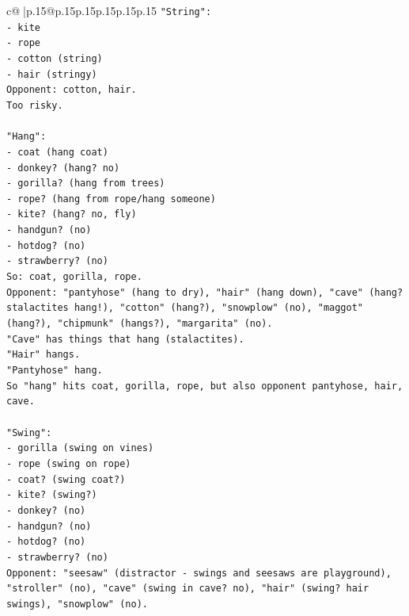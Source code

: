 \documentclass{article}
\begin{document}
{\begin{supertabular}{c@{$\;$}|p{.15\linewidth}@{}p{.15\linewidth}p{.15\linewidth}p{.15\linewidth}p{.15\linewidth}p{.15\linewidth}}
{{{\texttt{"String":} \\
\texttt{{-} kite} \\
\texttt{{-} rope} \\
\texttt{{-} cotton (string)} \\
\texttt{{-} hair (stringy)} \\
\texttt{Opponent: cotton, hair.} \\
\texttt{Too risky.} \\
\\ 
\texttt{"Hang":} \\
\texttt{{-} coat (hang coat)} \\
\texttt{{-} donkey? (hang? no)} \\
\texttt{{-} gorilla? (hang from trees)} \\
\texttt{{-} rope? (hang from rope/hang someone)} \\
\texttt{{-} kite? (hang? no, fly)} \\
\texttt{{-} handgun? (no)} \\
\texttt{{-} hotdog? (no)} \\
\texttt{{-} strawberry? (no)} \\
\texttt{So: coat, gorilla, rope.} \\
\texttt{Opponent: "pantyhose" (hang to dry), "hair" (hang down), "cave" (hang? stalactites hang!), "cotton" (hang?), "snowplow" (no), "maggot" (hang?), "chipmunk" (hangs?), "margarita" (no).} \\
\texttt{"Cave" has things that hang (stalactites).} \\
\texttt{"Hair" hangs.} \\
\texttt{"Pantyhose" hang.} \\
\texttt{So "hang" hits coat, gorilla, rope, but also opponent pantyhose, hair, cave.} \\
\\ 
\texttt{"Swing":} \\
\texttt{{-} gorilla (swing on vines)} \\
\texttt{{-} rope (swing on rope)} \\
\texttt{{-} coat? (swing coat?)} \\
\texttt{{-} kite? (swing?)} \\
\texttt{{-} donkey? (no)} \\
\texttt{{-} handgun? (no)} \\
\texttt{{-} hotdog? (no)} \\
\texttt{{-} strawberry? (no)} \\
\texttt{Opponent: "seesaw" (distractor {-} swings and seesaws are playground), "stroller" (no), "cave" (swing in cave? no), "hair" (swing? hair swings), "snowplow" (no).} \\
}}}
\end{supertabular}}
\end{document}
